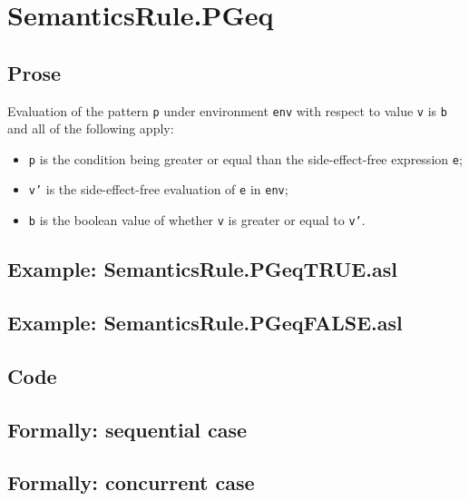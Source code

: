 \documentclass{book}
\begin{document}
\section{SemanticsRule.PGeq \label{sec:SemanticsRule.PGeq}}

    \subsection{Prose}
    Evaluation of the pattern \texttt{p} under environment \texttt{env} with
    respect to value \texttt{v} is \texttt{b} and all of the following apply:
    \begin{itemize}
      \item \texttt{p} is the condition being greater or equal than the side-effect-free expression \texttt{e};
      \item \texttt{v'} is the side-effect-free evaluation of \texttt{e} in \texttt{env};
      \item \texttt{b} is the boolean value of whether \texttt{v} is greater or equal to \texttt{v'}.
    \end{itemize}

    \subsection{Example: SemanticsRule.PGeqTRUE.asl}

    \subsection{Example: SemanticsRule.PGeqFALSE.asl}

  \subsection{Code}

\begin{emptyformal}
  \subsection{Formally: sequential case}

  \subsection{Formally: concurrent case}
\end{emptyformal}
\end{document}
